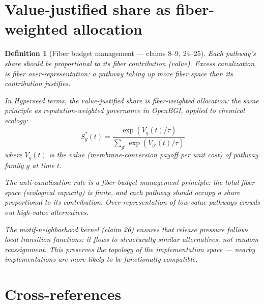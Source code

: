 \documentclass[11pt,a4paper]{article}
\newtheorem{definition}{Definition}[section]
\begin{document}
\section{Value-justified share as fiber-weighted allocation}
\label{sec:allocation}

\begin{definition}[Fiber budget management --- claims 8--9, 24--25]
\label{def:allocation}
Each pathway's share should be proportional to its fiber contribution
(value). Excess canalization is fiber over-representation: a pathway
taking up more fiber space than its contribution justifies.

In Hyperseed terms, the value-justified share is \emph{fiber-weighted
allocation}: the same principle as reputation-weighted governance in
OpenBGI, applied to chemical ecology:
\[
  S^*_g(t) = \frac{\exp(V_g(t) / \tau)}{\sum_{g'} \exp(V_{g'}(t) / \tau)}
\]
where $V_g(t)$ is the value (membrane-conversion payoff per unit cost)
of pathway family $g$ at time $t$.

The anti-canalization rule is a fiber-budget management principle:
the total fiber space (ecological capacity) is finite, and each
pathway should occupy a share proportional to its contribution.
Over-representation of low-value pathways crowds out high-value
alternatives.

The motif-neighborhood kernel (claim 26) ensures that release
pressure follows \emph{local transition functions}: it flows to
structurally similar alternatives, not random reassignment. This
preserves the topology of the implementation space --- nearby
implementations are more likely to be functionally compatible.
\end{definition}


\section{Cross-references}
\end{document}
